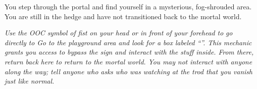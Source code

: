 \documentclass[white]{gl2018}
\begin{document}
\begin{sect}{9}
You step through the portal and find yourself in a mysterious, fog-shrouded area.  You are still in the hedge and have not transitioned back to the mortal world.

\textit{Use the OOC symbol of fist on your head or in front of your forehead to go directly to Go to the playground area and look for a box labeled ``\sSculptureGardenWarning{}''.  This mechanic grants you access to bypass the sign and interact with the stuff inside.  From there, return back here to return to the mortal world.  You may not interact with anyone along the way; tell anyone who asks who was watching at the trod that you vanish just like normal.}
\end{sect}
\begin{sect}{10}
\jumpto{\pOutInTheForestWeekend}
\end{sect}
\begin{sect}{11}
\jumpto{\pReflectingPoolWeekend}
\end{sect}
\begin{sect}{12}
\jumpto{\pAlbinoRedwoodWeekend}
\end{sect}
\end{document}
